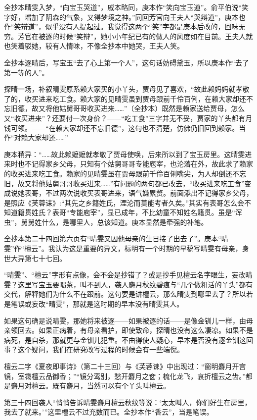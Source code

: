 \par 全抄本晴雯入梦，“向宝玉哭道”，戚本略同，庚本作“笑向宝玉道”。俞平伯说“笑字好，增加了阴森的气象，又得梦境之神。”同回芳官向王夫人“哭辩道”，庚本也作“笑辩道”，似乎没有人提起过。我觉得这两个“笑”字都是庚本后改的，回味无穷。芳官在被逐的时候“笑辩”，她小小年纪已有的做人的风度如在目前。王夫人就也笑着驳她，较有人情味，不像全抄本中她哭，王夫人笑。
\par 全抄本逐晴后，写宝玉“去了心上第一个人”，这句话妨碍黛玉，所以庚本作“去了第一等的人”。
\par 探晴一场，补叙晴雯原系赖大家买的小丫头，贾母见了喜欢，“故此赖妈妈就孝敬了的，收买进来吃工食。赖大家的见晴雯虽到贾母跟前千伶百俐，在赖大家却还不忘旧德，故又将他姑舅哥哥收买进来……”（全抄本）既然是赖家送给贾母，怎么又“收买进来”？还要付一次身价？——“吃工食”三字并无不妥，贾家的丫头都有月钱可领。——“在赖大家却还不忘旧德”，这句也不清楚，仿佛仍旧回到赖家。当作“对赖大家却还……”
\par 庚本稍异：“……故此赖嬷嬷就孝敬了贾母使唤，后来所以到了宝玉房里。这晴雯进来时也不记得家乡父母，只知有个姑舅哥哥专能庖宰，也沦落在外，故此求了赖家的收买进来吃工食。赖家的见晴雯虽在贾母跟前千伶百俐嘴尖，为人却倒还不忘旧，故又将他姑舅哥哥收买进来……”有问题的两句都已改去，“收买进来吃工食”变成说她表哥，不过两次说收买表哥进来，语气嫌累赘。前面添出不记得家乡父母，是照应《芙蓉诔》:“其先之乡籍姓氏，湮沦而莫能考者久矣。”其实有表哥怎么会不知道籍贯姓氏？表哥“专能庖宰”，显已成年，不比幼童不知姓名籍贯。虽是“浑虫”，舅舅姓什么，是哪里人，总该知道。庚本显然是牵强的补笔。
\par 全抄本第二十四回第六页有“晴雯又因他母亲的生日接了出去了”。庚本“晴雯”作“檀云”。我认为这是重要的异文，标明有一个时期的早稿写晴雯有母亲，身世大异第七十七回。
\par “晴雯”、“檀云”字形有点像，会不会是抄错了？或是抄手见檀云名字眼生，妄改晴雯？这里写宝玉要喝茶，叫不到人，袭人麝月秋纹碧痕与“几个做粗活的丫头”都有交代，解释她们为什么不在跟前。这句要是讲檀云，那么晴雯到哪里去了？所以若是笔误或妄改“晴雯”，那就是这时期的早本没有晴雯其人。
\par 如果这句确是说晴雯，那她将来被逐——如果被逐的话——是像金钏儿一样，由母亲领回去。如果正病着，有母亲看护，即使致命，探晴也没有这么凄凉。如果不是病死，是自杀，那就更与金钏儿犯重。不由得使人疑心，早本是否没有逐金钏这回事？这个疑问，我们在研究改写过程的时候会有一些端倪。
\par 檀云二字《夏夜即事诗》（第二十三回）与《芙蓉诔》中出现过：“窗明麝月开宫镜，室霭檀云品御香；”“镜分鸾别，愁开麝月之奁；梳化龙飞，哀折檀云之齿。”都是麝月对檀云。既有麝月，当然可以有个丫头叫檀云。
\par 第三十四回袭人“悄悄告诉晴雯麝月檀云秋纹等说：‘太太叫人，你们好生在房里，我去了就来。'”这里檀云不过充数而已。全抄本作“香云”，当是笔误。
